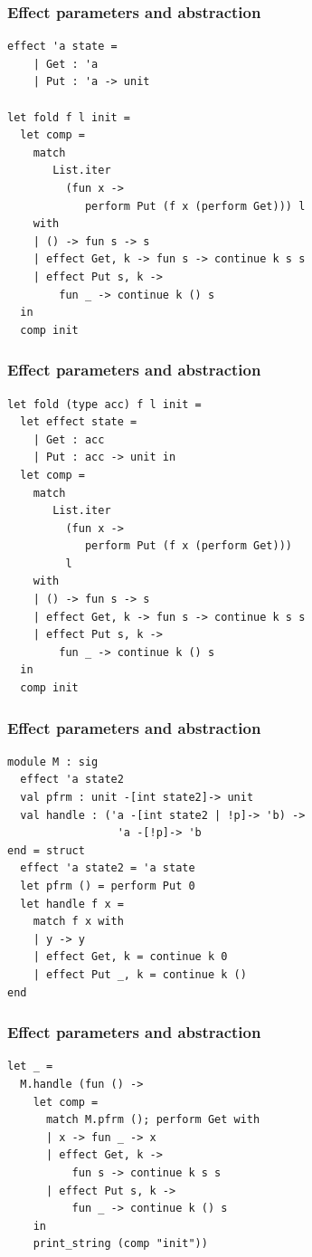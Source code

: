 \documentclass{beamer}
\begin{document}
\begin{frame}[fragile]
\frametitle{Effect parameters and abstraction}
\begin{lstlisting}[style=ocaml]
effect 'a state =
    | Get : 'a
    | Put : 'a -> unit

let fold f l init =
  let comp =
    match
       List.iter
         (fun x ->
            perform Put (f x (perform Get))) l
    with
    | () -> fun s -> s
    | effect Get, k -> fun s -> continue k s s
    | effect Put s, k ->
        fun _ -> continue k () s
  in
  comp init
\end{lstlisting}
\end{frame}

\begin{frame}[fragile]
\frametitle{Effect parameters and abstraction}
\begin{lstlisting}[style=ocaml]
let fold (type acc) f l init =
  let effect state =
    | Get : acc
    | Put : acc -> unit in
  let comp =
    match
       List.iter
         (fun x ->
            perform Put (f x (perform Get)))
         l
    with
    | () -> fun s -> s
    | effect Get, k -> fun s -> continue k s s
    | effect Put s, k ->
        fun _ -> continue k () s
  in
  comp init
\end{lstlisting}
\end{frame}

\begin{frame}[fragile]
\frametitle{Effect parameters and abstraction}
\begin{lstlisting}[style=ocaml]
module M : sig
  effect 'a state2
  val pfrm : unit -[int state2]-> unit
  val handle : ('a -[int state2 | !p]-> 'b) ->
                 'a -[!p]-> 'b
end = struct
  effect 'a state2 = 'a state
  let pfrm () = perform Put 0
  let handle f x =
    match f x with
    | y -> y
    | effect Get, k = continue k 0
    | effect Put _, k = continue k ()
end
\end{lstlisting}
\end{frame}

\begin{frame}[fragile]
\frametitle{Effect parameters and abstraction}
\begin{lstlisting}[style=ocaml]
let _ =
  M.handle (fun () ->
    let comp =
      match M.pfrm (); perform Get with
      | x -> fun _ -> x
      | effect Get, k ->
          fun s -> continue k s s
      | effect Put s, k ->
          fun _ -> continue k () s
    in
    print_string (comp "init"))
\end{lstlisting}
\end{frame}
\end{document}
